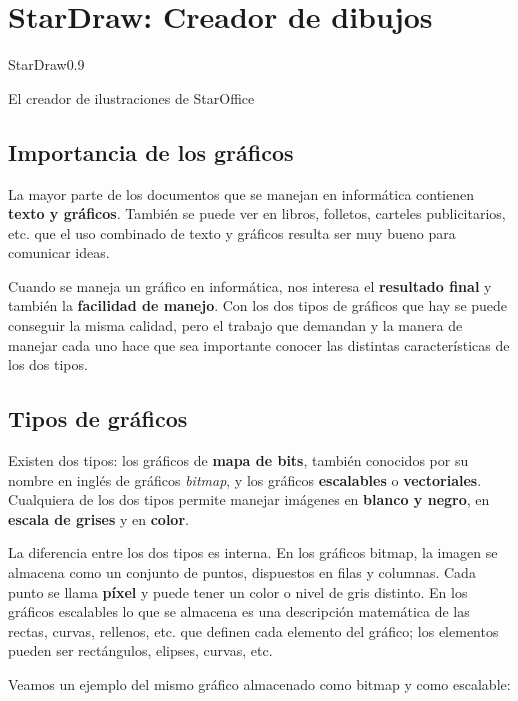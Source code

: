 \section{StarDraw: Creador de dibujos}
\begin{figura}{StarDraw}{0.9}
\caption{El creador de ilustraciones de StarOffice}
\end{figura}


\subsection{Importancia de los gráficos}

La mayor parte de los documentos que se manejan en informática
contienen \textbf{texto y gráficos}. También se puede ver en libros,
folletos, carteles publicitarios, etc. que el uso combinado de texto y
gráficos resulta ser muy bueno para comunicar ideas.

Cuando se maneja un gráfico en informática, nos interesa el
\textbf{resultado final} y también la \textbf{facilidad de
manejo}. Con los dos tipos de gráficos que hay se puede conseguir la
misma calidad, pero el trabajo que demandan y la manera de manejar
cada uno hace que sea importante conocer las distintas características
de los dos tipos.

\subsection{Tipos de gráficos}

Existen dos tipos: los gráficos de \textbf{mapa de bits}, también
conocidos por su nombre en inglés de gráficos \emph{bitmap}, y los
gráficos \textbf{escalables} o \textbf{vectoriales}. Cualquiera de los
dos tipos permite manejar imágenes en \textbf{blanco y negro}, en
\textbf{escala de grises} y en \textbf{color}.

La diferencia entre los dos tipos es interna. En los gráficos bitmap,
la imagen se almacena como un conjunto de puntos, dispuestos en filas
y columnas. Cada punto se llama \textbf{píxel} y puede tener un color
o nivel de gris distinto. En los gráficos escalables lo que se
almacena es una descripción matemática de las rectas, curvas,
rellenos, etc. que definen cada elemento del gráfico; los elementos
pueden ser rectángulos, elipses, curvas, etc.

Veamos un ejemplo del mismo gráfico almacenado como bitmap y como
escalable:

